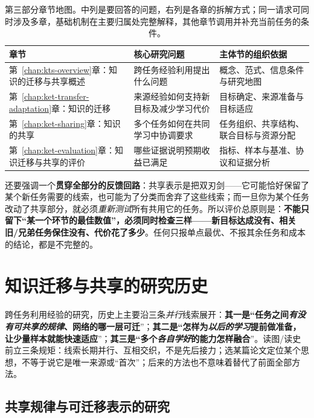 \begin{table}[htbp]
  \centering
  \small
  \begin{tabularx}{\linewidth}{@{}p{50mm}XX@{}}
    \toprule
    章节 & 核心研究问题 & 主体节的组织依据 \\
    \midrule
    第~\ref{chap:kts-overview}章：知识的迁移与共享概述 & 跨任务经验利用提出什么问题 & 概念、范式、信息条件与研究地图 \\
    第~\ref{chap:ket-transfer-adaptation}章：知识的迁移 & 来源经验如何支持新目标及减少学习代价 & 目标确定、来源准备与目标适应 \\
    第~\ref{chap:ket-sharing}章：知识的共享 & 多个任务如何在共同学习中协调要求 & 任务组织、共享结构、联合目标与资源分配 \\
    第~\ref{chap:ket-evaluation}章：知识迁移与共享的评价 & 哪些证据说明预期收益已满足 & 指标、样本与基准、协议和证据分析 \\
    \bottomrule
  \end{tabularx}
  \caption{第三部分章节地图。中列是要回答的问题，右列是各章的拆解方式；同一请求可同时涉及多章，基础机制在主要归属处完整解释，其他章节调用并补充当前任务的条件。}
  \label{tab:kts-overview-chapters}
\end{table}

还要强调一个\textbf{贯穿全部分的反馈回路}：共享表示是把双刃剑——它可能恰好保留了某个新任务需要的线索，也可能为了分类而舍弃了这些线索；而一旦你为某个任务改动了共享部分，就必须\emph{重新测试}所有共用它的任务。所以评价总原则是：\textbf{不能只留下“某一个环节的最佳数值”，必须同时检查三样——新目标达成没有、相关旧/兄弟任务保住没有、代价花了多少}。任何只报单点最优、不报其余任务和成本的结论，都是不完整的。

\section{知识迁移与共享的研究历史}
\label{sec:kts-overview-history}

跨任务利用经验的研究，历史上主要沿三条\emph{并行}线索展开：\textbf{其一是“任务之间\emph{有没有可共享的规律}、网络的哪一层可迁}”；\textbf{其二是“怎样为\emph{以后的学习}提前做准备，让少量样本就能快速适应}”；\textbf{其三是“多个\emph{各自学好}的能力怎样融合}”。读图/读史前立三条规矩：线索长期并行、互相交织，不是先后接力；选某篇论文定位某个思想，不等于说它是唯一来源或“首次”；后来的方法也不意味着替代了前面全部方法。

\subsection{共享规律与可迁移表示的研究}
\label{sec:kts-overview-history-representation}

